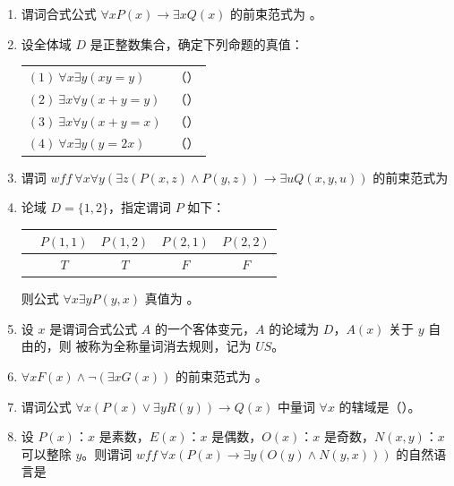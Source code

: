 \begin{enumerate}
	
	\item 谓词合式公式 \(\forall xP(x)\to \exists xQ(x)\) 的前束范式为 \underline{\hspace{6cm}}。
	
	\item 设全体域 \(D\) 是正整数集合，确定下列命题的真值：
	
	\begin{tabular}{ll}
		\((1)\ \forall x\exists y(xy=y)\) & （\quad） \\
		\((2)\ \exists x\forall y(x+y=y)\) & （\quad） \\
		\((3)\ \exists x\forall y(x+y=x)\) & （\quad） \\
		\((4)\ \forall x\exists y(y=2x)\) & （\quad）
	\end{tabular}
	
	
	\item 谓词 \(wff\ \forall x\forall y(\exists z(P(x,z)\land P(y,z))\to \exists uQ(x,y,u))\) 的前束范式为

	
	\item 论域 \(D=\{1,2\}\)，指定谓词 \(P\) 如下：
	
	\begin{center}
		\begin{tabular}{c|cccc}
			& \(P(1,1)\) & \(P(1,2)\) & \(P(2,1)\) & \(P(2,2)\) \\
			\hline
			& \(T\) & \(T\) & \(F\) & \(F\)
		\end{tabular}
	\end{center}
	
	则公式 \(\forall x\exists yP(y,x)\) 真值为 \underline{\hspace{5cm}}。
	
	\item 设 \(x\) 是谓词合式公式 \(A\) 的一个客体变元，\(A\) 的论域为 \(D\)，\(A(x)\) 关于 \(y\) 自由的，则 \underline{\hspace{6cm}} 被称为全称量词消去规则，记为 \(US\)。
	
	\item \(\forall xF(x)\land \neg(\exists xG(x))\) 的前束范式为 \underline{\hspace{6cm}}。
	
	\item 谓词公式 \(\forall x(P(x)\vee \exists yR(y))\to Q(x)\) 中量词 \(\forall x\) 的辖域是（\quad）。
	
	
	\item 设 \(P(x)\)：\(x\) 是素数，\(E(x)\)：\(x\) 是偶数，\(O(x)\)：\(x\) 是奇数，\(N(x,y)\)：\(x\) 可以整除 \(y\)。则谓词 \(wff\ \forall x(P(x)\to \exists y(O(y)\land N(y,x)))\) 的自然语言是
	
\end{enumerate}


